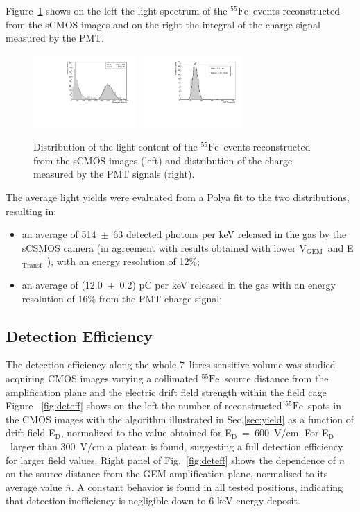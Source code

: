 \documentclass[physics,article,submit,moreauthors,pdftex]{Definitions/mdpi}
\newcommand{\fe}{\ensuremath{^{55}\textrm{Fe}}\xspace}
\newcommand{\Ed}  {E$_{\mathrm{D}}$\xspace}
\newcommand{\Et}  {E$_{\mathrm{Transf}}$\xspace}
\newcommand{\Vg}  {V$_{\mathrm{GEM}}$\xspace}
\begin{document}
Figure~\ref{fig:light} shows on the left the light spectrum of the \fe\ events reconstructed from the sCMOS images and on the right the integral of the charge signal measured by the PMT.

\begin{figure}[t!]
\centering
\includegraphics[width=0.35\textwidth]{DB_Integral_6040.pdf}
\includegraphics[width=0.35\textwidth]{newlightCharge_Run1834_Mix60-40.pdf}
\caption{Distribution of the light content of the \fe~events reconstructed from the sCMOS images  (left) and distribution of the charge measured by the PMT signals (right).} 
\label{fig:light}
\end{figure}

The average light yields were evaluated from a Polya fit \cite{bib:rolandiblum} to the two distributions, resulting in:
\begin{itemize}
    \item an average of 514~$\pm$~63 detected photons per keV released in the gas by the sCSMOS camera (in agreement with results obtained with lower \Vg\ and \Et\ \cite{bib:fe55}), with an energy resolution of 12\%;
    \item an average of (12.0~$\pm$~0.2) pC per keV released in the gas with an energy resolution of 16\% from the PMT charge signal;
\end{itemize}

\subsection{Detection Efficiency}

The detection efficiency along the whole 7~litres sensitive volume was studied acquiring CMOS images varying a collimated \fe\ source distance from the amplification plane and the electric drift field strength within the field cage Figure ~\ref{fig:deteff} shows on the left the number of reconstructed \fe\ spots in the CMOS images with the algorithm illustrated in Sec.\ref{sec:yield} as a function of drift field \Ed, normalized to the value obtained for \Ed~=~600~V/cm. For \Ed\ larger than 300~V/cm a plateau is found, suggesting  a full detection efficiency for larger field values. Right panel of Fig.~\ref{fig:deteff} shows the dependence of $n$ on the source distance from the GEM amplification plane, normalised to its average value $\overline{n}$. A constant behavior is found in all tested positions, indicating that detection inefficiency is negligible down to 6 keV energy deposit.
\end{document}
